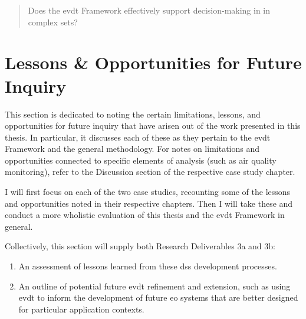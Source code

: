 \blockquote{Does the \ac{evdt} Framework effectively support decision-making in in complex \ac{sets}?}

\section{Lessons \& Opportunities for Future Inquiry} \label{sec:future-inquiry}

This section is dedicated to noting the certain limitations, lessons, and opportunities for future inquiry that have arisen out of the work presented in this thesis. In particular, it discusses each of these as they pertain to the \ac{evdt} Framework and the general methodology. For notes on limitations and opportunities connected to specific elements of analysis (such as air quality monitoring), refer to the Discussion section of the respective case study chapter.

I will first focus on each of the two case studies, recounting some of the lessons and opportunities noted in their respective chapters. Then I will take these and conduct a more wholistic evaluation of this thesis and the \ac{evdt} Framework in general.

Collectively, this section will supply both Research Deliverables 3a and 3b:

\begin{enumerate}[label=\emph{\alph*},itemsep=0pt,parsep=0pt]
	\item{An assessment of lessons learned from these \ac{dss} development processes.} 
	\item{An outline of potential future \ac{evdt} refinement and extension, such as using \ac{evdt} to inform the development of future \ac{eo} systems that are better designed for particular application contexts.} 
\end{enumerate}





